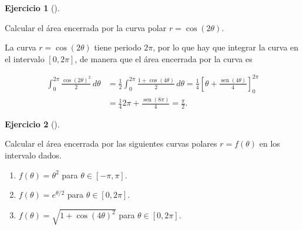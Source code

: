 \documentclass[
  spanish,
  a4paper,
]{scrreport}
\theoremstyle{definition}
\newtheorem{exercise}{Ejercicio}[chapter]
\theoremstyle{remark}
\begin{document}
\begin{exercise}[]\protect\hypertarget{exr-area-polar}{}\label{exr-area-polar}

Calcular el área encerrada por la curva polar \(r=\cos(2\theta)\).

\end{exercise}

\begin{tcolorbox}[enhanced jigsaw, arc=.35mm, bottomrule=.15mm, bottomtitle=1mm, breakable, colback=white, colbacktitle=quarto-callout-tip-color!10!white, colframe=quarto-callout-tip-color-frame, coltitle=black, left=2mm, leftrule=.75mm, opacityback=0, opacitybacktitle=0.6, rightrule=.15mm, title=\textcolor{quarto-callout-tip-color}{\faLightbulb}\hspace{0.5em}{Solución}, titlerule=0mm, toprule=.15mm, toptitle=1mm]

La curva \(r=\cos(2\theta)\) tiene periodo \(2\pi\), por lo que hay que
integrar la curva en el intervalo \([0,2\pi]\), de manera que el área
encerrada por la curva es

\begin{align*}
\int_0^{2\pi} \frac{\cos(2\theta)^2}{2}\,d\theta 
&= \frac{1}{2} \int_0^{2\pi}\frac{1+\cos(4\theta)}{2}\,d\theta
= \frac{1}{4}\left[\theta + \frac{\operatorname{sen}(4\theta)}{4}\right]_0^{2\pi}\\
&= \frac{1}{4} 2\pi + \frac{\operatorname{sen}(8\pi)}{4}
= \frac{\pi}{2}.
\end{align*}

\end{tcolorbox}

\begin{exercise}[]\protect\hypertarget{exr-area-polares}{}\label{exr-area-polares}

Calcular el área encerrada por las siguientes curvas polares
\(r=f(\theta)\) en los intervalo dados.

\begin{enumerate}
\def\labelenumi{\alph{enumi}.}
\item
  \(f(\theta) = \theta^2\) para \(\theta\in[-\pi,\pi]\).
\item
  \(f(\theta) = e^{\theta/2}\) para \(\theta\in[0,2\pi]\).
\item
  \(f(\theta) = \sqrt{1+\cos(4\theta)^2}\) para \(\theta\in[0,2\pi]\).
\end{enumerate}

\end{exercise}
\end{document}
